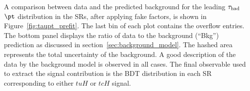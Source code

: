 A comparison between data and the predicted background for the leading $\tau_{\mathrm{had}}$ $\pt$ distribution in the SRs, after applying fake factors, 
is shown in Figure~\ref{fig:taupt_prefit}.
The last bin of each plot contains the overflow entries.
The bottom panel displays the ratio of data to the background (``Bkg'') prediction as discussed in section~\ref{sec:background_model}.
The hashed area represents the total uncertainty of the background.
A good description of the data by the background model is observed in all cases.
The final observable used to extract the signal contribution is the BDT distribution in each SR corresponding to either $tuH$ or $tcH$ signal.

